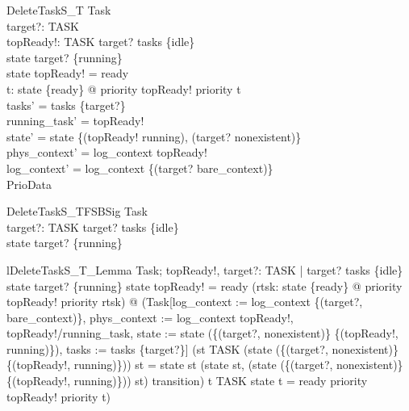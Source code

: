 \begin{schema}{DeleteTaskS\_T}
  \Delta Task\\
  target?: TASK\\
  topReady!: TASK
\where
  target? \in  tasks \setminus  \{idle\}\\
  state target? \in  \{running\}\\
  state topReady! = ready\\
  \forall  t: state \inv  \limg  \{ready\} \rimg  @ priority topReady! \geq  priority t\\
  tasks' = tasks \setminus  \{target?\}\\
  running\_task' = topReady!\\
  state' = state \oplus  \{(topReady! \mapsto  running), (target? \mapsto  nonexistent)\}\\
  phys\_context' = log\_context topReady!\\
  log\_context' = log\_context \oplus  \{(target? \mapsto  bare\_context)\}\\
  \Xi PrioData
\end{schema}

\begin{schema}{DeleteTaskS\_TFSBSig}
  Task\\
  target?: TASK
\where
  target? \in  tasks \setminus  \{idle\}\\
  state target? \in  \{running\}
\end{schema}

\begin{theorem}{lDeleteTaskS\_T\_Lemma}
\forall  Task; topReady!, target?: TASK | target? \in  tasks \setminus  \{idle\} \land  state target? \in  \{running\} \land  state topReady! = ready \land  (\forall  rtsk: state \inv  \limg  \{ready\} \rimg  @ priority topReady! \geq  priority rtsk) @ \lnot  (Task[log\_context := log\_context \oplus  \{(target?, bare\_context)\}, phys\_context := log\_context topReady!, topReady!/running\_task, state := state \oplus  (\{(target?, nonexistent)\} \cup  \{(topReady!, running)\}), tasks := tasks \setminus  \{target?\}] \land  (st \in  TASK \land  \lnot  (state \oplus  (\{(target?, nonexistent)\} \cup  \{(topReady!, running)\})) st = state st \implies  (state st, (state \oplus  (\{(target?, nonexistent)\} \cup  \{(topReady!, running)\})) st) \in  transition) \implies  t \in  TASK \land  state t = ready \land  \lnot  priority topReady! \geq  priority t)
\end{theorem}

